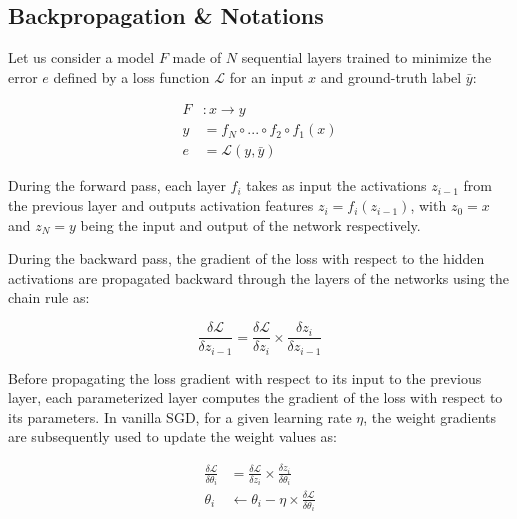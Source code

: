\documentclass[twocolumn]{bmcart}
\begin{document}
\subsection{Backpropagation \& Notations}

Let us consider a model $F$ made of $N$ sequential layers trained to minimize the error $e$ defined by a loss function $\mathcal{L}$ for an input $x$ and ground-truth label $\bar{y}$:

 \begin{subequations}
 	\begin{align}
 	F &: x \rightarrow y \\
 	y &= f_N \circ ... \circ f_2 \circ f_1(x) \\
 	e &=  \mathcal{L}(y, \bar{y})
 	\end{align}
 \end{subequations}

During the forward pass, each layer $f_i$ takes as input the activations $z_{i-1}$ from the previous layer and outputs activation features $z_i=f_i(z_{i-1})$, with $z_0=x$ and $z_N=y$ being the input and output of the network respectively.

During the backward pass, the gradient of the loss with respect to the hidden activations are propagated backward through the layers of the networks using the chain rule as:


\begin{equation}
\frac{\delta \mathcal{L}}{\delta z_{i-1}} = \frac{\delta \mathcal{L}}{\delta z_{i}}  \times \frac{\delta z_{i}}{\delta z_{i-1}}
\end{equation}

Before propagating the loss gradient with respect to its input to the previous layer,
each parameterized layer computes the gradient of the loss with respect to its parameters.
In vanilla SGD, for a given learning rate $\eta$, the weight gradients are subsequently used to update the weight values as:

\begin{subequations}
\begin{align}
\frac{\delta \mathcal{L}}{\delta \theta_i} & =\frac{\delta \mathcal{L}}{\delta z_{i}}  \times \frac{\delta z_{i}}{\delta \theta_i} \\
\theta_i & \leftarrow \theta_i - \eta \times \frac{\delta \mathcal{L}}{\delta \theta_i}
\end{align}
\end{subequations}
\end{document}
